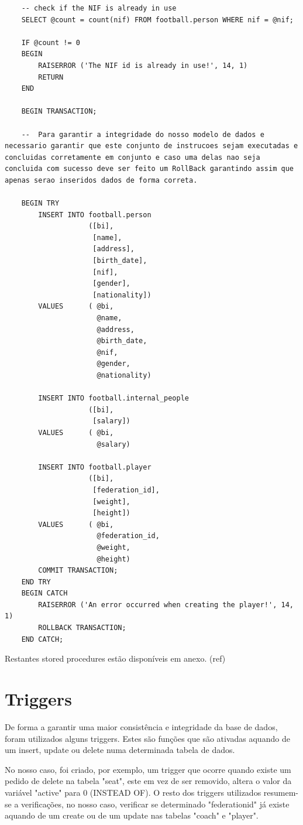 \documentclass[pdftex,12pt,a4paper]{report}
\begin{document}
\begin{lstlisting}
	-- check if the NIF is already in use
	SELECT @count = count(nif) FROM football.person WHERE nif = @nif;

	IF @count != 0
	BEGIN
		RAISERROR ('The NIF id is already in use!', 14, 1)
		RETURN
	END

	BEGIN TRANSACTION;
	
	--  Para garantir a integridade do nosso modelo de dados e necessario garantir que este conjunto de instrucoes sejam executadas e concluidas corretamente em conjunto e caso uma delas nao seja concluida com sucesso deve ser feito um RollBack garantindo assim que apenas serao inseridos dados de forma correta.
	
	BEGIN TRY
		INSERT INTO football.person 
					([bi], 
					 [name], 
					 [address], 
					 [birth_date], 
					 [nif], 
					 [gender],
					 [nationality]) 
		VALUES      ( @bi, 
					  @name, 
					  @address, 
					  @birth_date, 
					  @nif, 
					  @gender,
					  @nationality) 

		INSERT INTO football.internal_people 
					([bi], 
					 [salary]) 
		VALUES      ( @bi, 
					  @salary) 

		INSERT INTO football.player 
					([bi], 
					 [federation_id], 
					 [weight],
					 [height]) 
		VALUES      ( @bi, 
					  @federation_id, 
					  @weight,
					  @height)
		COMMIT TRANSACTION;
	END TRY
	BEGIN CATCH
		RAISERROR ('An error occurred when creating the player!', 14, 1)
		ROLLBACK TRANSACTION;
	END CATCH;

\end{lstlisting}
 \vspace{0,5in}

Restantes stored procedures estão disponíveis em anexo. (ref)

\newpage
\section{Triggers}
De forma a garantir uma maior consistência e integridade da base de dados, foram utilizados alguns triggers. Estes são funções que são ativadas aquando de um insert, update ou delete numa determinada tabela de dados.

No nosso caso, foi criado, por exemplo, um  trigger que ocorre quando existe um pedido de delete na tabela "seat", este em vez de ser removido, altera o valor da variável "active" para 0 (INSTEAD OF).
O resto dos triggers utilizados resumem-se a verificações, no nosso caso, verificar se determinado "federation{\textunderscore}id" já existe aquando de um create ou de um update nas tabelas "coach" e "player".
\end{document}
